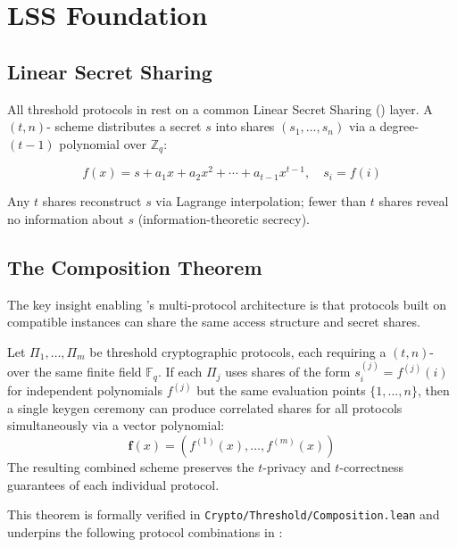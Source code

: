 \section{LSS Foundation}

\label{sec:lss}

\subsection{Linear Secret Sharing}

All threshold protocols in \TChain{} rest on a common Linear Secret Sharing (\LSS{}) layer. A $(t, n)$-\LSS{} scheme distributes a secret $s$ into shares $(s_1, \ldots, s_n)$ via a degree-$(t{-}1)$ polynomial over $\mathbb{Z}_q$:

\begin{equation}
f(x) = s + a_1 x + a_2 x^2 + \cdots + a_{t-1} x^{t-1}, \quad s_i = f(i)
\end{equation}

Any $t$ shares reconstruct $s$ via Lagrange interpolation; fewer than $t$ shares reveal no information about $s$ (information-theoretic secrecy).

\subsection{The Composition Theorem}

The key insight enabling \TChain{}'s multi-protocol architecture is that protocols built on compatible \LSS{} instances can share the same access structure and secret shares.

\begin{theorem}
\label{thm:composition}
Let $\Pi_1, \ldots, \Pi_m$ be threshold cryptographic protocols, each requiring a $(t, n)$-\LSS{} over the same finite field $\mathbb{F}_q$. If each $\Pi_j$ uses shares of the form $s_i^{(j)} = f^{(j)}(i)$ for independent polynomials $f^{(j)}$ but the same evaluation points $\{1, \ldots, n\}$, then a single keygen ceremony can produce correlated shares for all protocols simultaneously via a vector polynomial:
\[
\mathbf{f}(x) = (f^{(1)}(x), \ldots, f^{(m)}(x))
\]
The resulting combined scheme preserves the $t$-privacy and $t$-correctness guarantees of each individual protocol.
\end{theorem}

This theorem is formally verified in \texttt{Crypto/Threshold/Composition.lean} and underpins the following protocol combinations in \TChain{}:

